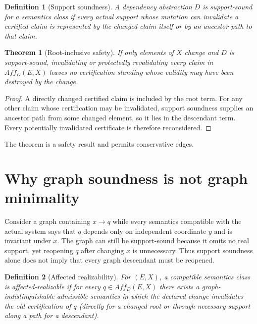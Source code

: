 \documentclass[11pt]{article}
\newtheorem{theorem}{Theorem}
\newtheorem{definition}{Definition}
\begin{document}
\begin{definition}[Support soundness]
A dependency abstraction $D$ is support-sound for a semantics class if every actual support whose mutation can invalidate a certified claim is represented by the changed claim itself or by an ancestor path to that claim.
\end{definition}

\begin{theorem}[Root-inclusive safety]
If only elements of $X$ change and $D$ is support-sound, invalidating or protectedly revalidating every claim in $Aff_D(E,X)$ leaves no certification standing whose validity may have been destroyed by the change.
\end{theorem}
\begin{proof}
A directly changed certified claim is included by the root term. For any other claim whose certification may be invalidated, support soundness supplies an ancestor path from some changed element, so it lies in the descendant term. Every potentially invalidated certificate is therefore reconsidered.
\end{proof}

The theorem is a safety result and permits conservative edges.

\section{Why graph soundness is not graph minimality}
Consider a graph containing $x\rightarrow q$ while every semantics compatible with the actual system says that $q$ depends only on independent coordinate $y$ and is invariant under $x$. The graph can still be support-sound because it omits no real support, yet reopening $q$ after changing $x$ is unnecessary. Thus support soundness alone does not imply that every graph descendant must be reopened.

\begin{definition}[Affected realizability]
For $(E,X)$, a compatible semantics class is affected-realizable if for every $q\in Aff_D(E,X)$ there exists a graph-indistinguishable admissible semantics in which the declared change invalidates the old certification of $q$ (directly for a changed root or through necessary support along a path for a descendant).
\end{definition}
\end{document}
